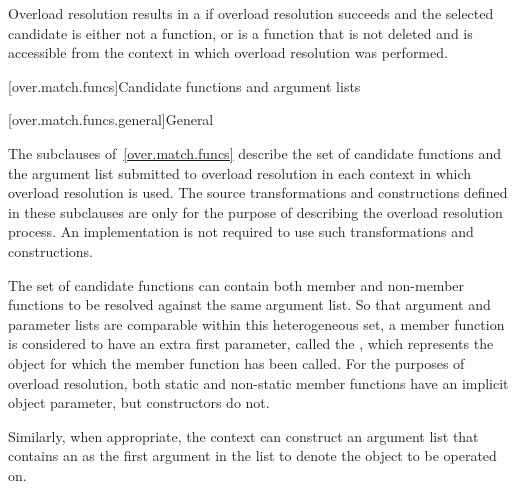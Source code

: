 \pnum
Overload resolution results in a 
if overload resolution succeeds and
the selected candidate
is either not a function, or
is a function that is not deleted and
is accessible from the context
in which overload resolution was performed.

[over.match.funcs]{Candidate functions and argument lists}%

[over.match.funcs.general]{General}%
%

\pnum
The subclauses of~\ref{over.match.funcs} describe
the set of candidate functions and the argument list submitted to
overload resolution in each context in which
overload resolution is used.
The source transformations and constructions defined
in these subclauses are only for the purpose of describing the
overload resolution process.
An implementation is not required
to use such transformations and constructions.

\pnum
{}%
%
The set of candidate functions can contain both member and non-member
functions to be resolved against the same argument list.
So that argument and parameter lists are comparable within this
heterogeneous set, a member function is considered to have an
extra first parameter, called the
,
which represents the object for which the member function has been
called.
For the purposes of overload resolution, both static and
non-static member functions have an implicit object parameter,
but constructors do not.

\pnum
Similarly, when appropriate, the context can construct an
argument list that contains an
as the first argument in the list to denote
the object to be operated on.

